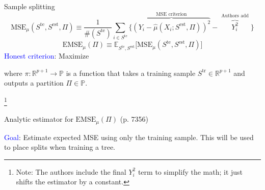 \documentclass{beamer}
\newcommand{\E}{{\mathbb{E}}}
\renewcommand{\P}{\mathbb{P}}
\newcommand{\myfootnote}{\let\thefootnote\relax\footnote}
\newcommand{\blue}[1]{\textcolor{blue}{#1}}
\newcommand{\green}[1]{\textcolor{olive}{#1}}
\begin{document}
\begin{frame}{Sample splitting}
$$\text{MSE}_\mu(S^\text{te},S^\text{est},\Pi) \equiv \frac{1}{\#(S^\text{te})}\sum_{i\in S^\text{te}}\bigg\{\overbrace{(Y_i-\hat\mu(X_i;S^\text{est},\Pi))^2}^\text{MSE criterion} - \overbrace{Y_i^2}^{\substack{\text{Authors add}}}\bigg\}$$ \pause
$$\text{EMSE}_\mu(\Pi) \equiv \E_{S^\text{te},S^\text{est}}\bigg[\text{MSE}_\mu(S^\text{te},S^\text{est},\Pi)\bigg]$$ \pause
\blue{Honest criterion}: Maximize
\begin{center}
\end{center}
where $\pi:\mathbb{R}^{p+1}\rightarrow \P$ is a function that takes a training sample $S^\text{tr}\in\mathbb{R}^{p+1}$ and outputs a partition $\Pi\in\P$.

\myfootnote{Note: The authors include the final $Y_i^2$ term to simplify the math; it just shifts the estimator by a constant.}
\end{frame}

\begin{frame}{Analytic estimator for $\text{EMSE}_\mu(\Pi)$ (p. 7356)}
\begin{center}
\Large \blue{Goal}: Estimate expected MSE using only the training sample. \vskip 1cm
This will be used to place splits when training a tree.
\end{center}
\end{frame}
\end{document}
